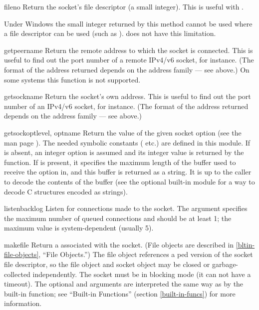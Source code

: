 \begin{methoddesc}[socket]{fileno}{}
Return the socket's file descriptor (a small integer).  This is useful
with .

Under Windows the small integer returned by this method cannot be used where
a file descriptor can be used (such as ).  \UNIX{} does
not have this limitation.
\end{methoddesc}

\begin{methoddesc}[socket]{getpeername}{}
Return the remote address to which the socket is connected.  This is
useful to find out the port number of a remote IPv4/v6 socket, for instance.
(The format of the address returned depends on the address family ---
see above.)  On some systems this function is not supported.
\end{methoddesc}

\begin{methoddesc}[socket]{getsockname}{}
Return the socket's own address.  This is useful to find out the port
number of an IPv4/v6 socket, for instance.
(The format of the address returned depends on the address family ---
see above.)
\end{methoddesc}

\begin{methoddesc}[socket]{getsockopt}{level, optname}
Return the value of the given socket option (see the \UNIX{} man page
).  The needed symbolic constants
( etc.) are defined in this module.  If 
is absent, an integer option is assumed and its integer value
is returned by the function.  If  is present, it specifies
the maximum length of the buffer used to receive the option in, and
this buffer is returned as a string.  It is up to the caller to decode
the contents of the buffer (see the optional built-in module
 for a way to decode C structures encoded as strings).
\end{methoddesc}

\begin{methoddesc}[socket]{listen}{backlog}
Listen for connections made to the socket.  The  argument
specifies the maximum number of queued connections and should be at
least 1; the maximum value is system-dependent (usually 5).
\end{methoddesc}

\begin{methoddesc}[socket]{makefile}{}
Return a  associated with the socket.  (File objects
are described in \ref{bltin-file-objects}, ``File Objects.'')
The file object references a ped version of the
socket file descriptor, so the file object and socket object may be
closed or garbage-collected independently.
The socket must be in blocking mode (it can not have a timeout).
The optional 
and  arguments are interpreted the same way as by the
built-in  function; see ``Built-in Functions''
(section \ref{built-in-funcs}) for more information.
\end{methoddesc}


